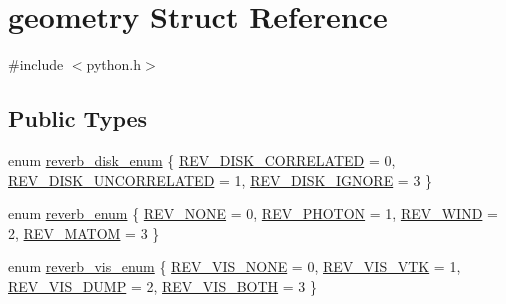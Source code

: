 \hypertarget{structgeometry}{}\section{geometry Struct Reference}
\label{structgeometry}


{\ttfamily \#include $<$python.\+h$>$}

\subsection*{Public Types}
\begin{DoxyCompactItemize}
\item 
enum \hyperlink{structgeometry_a38a806db00f0535995ab885e461ea7e5}{reverb\+\_\+disk\+\_\+enum} \{ \hyperlink{structgeometry_a38a806db00f0535995ab885e461ea7e5aedc73a6ea0d70a25499774fb1e0f75d9}{R\+E\+V\+\_\+\+D\+I\+S\+K\+\_\+\+C\+O\+R\+R\+E\+L\+A\+T\+ED} = 0, 
\hyperlink{structgeometry_a38a806db00f0535995ab885e461ea7e5a40aaacff12c205d81f7b1e3c80300481}{R\+E\+V\+\_\+\+D\+I\+S\+K\+\_\+\+U\+N\+C\+O\+R\+R\+E\+L\+A\+T\+ED} = 1, 
\hyperlink{structgeometry_a38a806db00f0535995ab885e461ea7e5ae38bc55e72b03dc4626646f1841b4bff}{R\+E\+V\+\_\+\+D\+I\+S\+K\+\_\+\+I\+G\+N\+O\+RE} = 3
 \}
\item 
enum \hyperlink{structgeometry_aa560b242e44807dcdc99ef50ac44edf0}{reverb\+\_\+enum} \{ \hyperlink{structgeometry_aa560b242e44807dcdc99ef50ac44edf0ab06fb87076fe5d62b566bc03d1bec93d}{R\+E\+V\+\_\+\+N\+O\+NE} = 0, 
\hyperlink{structgeometry_aa560b242e44807dcdc99ef50ac44edf0ac780278d26128e91edb49a73e68a2303}{R\+E\+V\+\_\+\+P\+H\+O\+T\+ON} = 1, 
\hyperlink{structgeometry_aa560b242e44807dcdc99ef50ac44edf0a59d69621f25125085ecf5e3e6fd10099}{R\+E\+V\+\_\+\+W\+I\+ND} = 2, 
\hyperlink{structgeometry_aa560b242e44807dcdc99ef50ac44edf0a9170cfe8909aecca1d330c51c67c56ce}{R\+E\+V\+\_\+\+M\+A\+T\+OM} = 3
 \}
\item 
enum \hyperlink{structgeometry_a335f65b5ed9d32c11f5ecd108969dae2}{reverb\+\_\+vis\+\_\+enum} \{ \hyperlink{structgeometry_a335f65b5ed9d32c11f5ecd108969dae2a6ef37c2dc00705e084f27b7d02f267e1}{R\+E\+V\+\_\+\+V\+I\+S\+\_\+\+N\+O\+NE} = 0, 
\hyperlink{structgeometry_a335f65b5ed9d32c11f5ecd108969dae2a808397d708324d744e287123d458daa6}{R\+E\+V\+\_\+\+V\+I\+S\+\_\+\+V\+TK} = 1, 
\hyperlink{structgeometry_a335f65b5ed9d32c11f5ecd108969dae2a05290635f1a257412567b03d6042c8ff}{R\+E\+V\+\_\+\+V\+I\+S\+\_\+\+D\+U\+MP} = 2, 
\hyperlink{structgeometry_a335f65b5ed9d32c11f5ecd108969dae2adceacdc753f8234644e62cdfedc44f4a}{R\+E\+V\+\_\+\+V\+I\+S\+\_\+\+B\+O\+TH} = 3
 \}
\end{DoxyCompactItemize}
